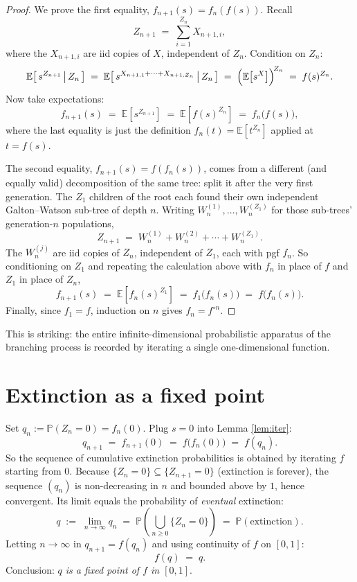 \documentclass[11pt]{article}
\begin{document}
\begin{proof}
We prove the first equality, $f_{n+1}(s) = f_n(f(s))$. Recall
\[
Z_{n+1} \;=\; \sum_{i=1}^{Z_n} X_{n+1, i},
\]
where the $X_{n+1, i}$ are iid copies of $X$, independent of $Z_n$. Condition on $Z_n$:
\[
\mathbb{E}\!\left[\,s^{Z_{n+1}}\,\big|\,Z_n\,\right]
\;=\; \mathbb{E}\!\left[\,s^{X_{n+1,1} + \cdots + X_{n+1, Z_n}}\,\big|\,Z_n\,\right]
\;=\; \Bigl(\mathbb{E}\!\left[s^X\right]\Bigr)^{\!Z_n}
\;=\; f(s)^{Z_n}.
\]
Now take expectations:
\[
f_{n+1}(s) \;=\; \mathbb{E}\!\left[s^{Z_{n+1}}\right]
           \;=\; \mathbb{E}\!\left[f(s)^{Z_n}\right]
           \;=\; f_n\!\bigl(f(s)\bigr),
\]
where the last equality is just the definition $f_n(t) = \mathbb{E}[t^{Z_n}]$ applied at $t = f(s)$.

The second equality, $f_{n+1}(s) = f(f_n(s))$, comes from a different (and equally valid) decomposition of the same tree: split it after the very first generation. The $Z_1$ children of the root each found their own independent Galton--Watson sub-tree of depth $n$. Writing $W^{(1)}_n, \dots, W^{(Z_1)}_n$ for those sub-trees' generation-$n$ populations,
\[
Z_{n+1} \;=\; W^{(1)}_n + W^{(2)}_n + \cdots + W^{(Z_1)}_n.
\]
The $W^{(j)}_n$ are iid copies of $Z_n$, independent of $Z_1$, each with pgf $f_n$. So conditioning on $Z_1$ and repeating the calculation above with $f_n$ in place of $f$ and $Z_1$ in place of $Z_n$,
\[
f_{n+1}(s) \;=\; \mathbb{E}\!\left[f_n(s)^{Z_1}\right] \;=\; f_1\!\bigl(f_n(s)\bigr) \;=\; f\!\bigl(f_n(s)\bigr).
\]
Finally, since $f_1 = f$, induction on $n$ gives $f_n = f^{\circ n}$.
\end{proof}

This is striking: the entire infinite-dimensional probabilistic apparatus of the branching process is recorded by iterating a single one-dimensional function.

\section{Extinction as a fixed point}
Set $q_n := \mathbb{P}(Z_n = 0) = f_n(0)$. Plug $s = 0$ into Lemma \ref{lem:iter}:
\[
q_{n+1} \;=\; f_{n+1}(0) \;=\; f\!\bigl(f_n(0)\bigr) \;=\; f(q_n).
\]
So the sequence of cumulative extinction probabilities is obtained by iterating $f$ starting from $0$. Because $\{Z_n = 0\} \subseteq \{Z_{n+1} = 0\}$ (extinction is forever), the sequence $(q_n)$ is non-decreasing in $n$ and bounded above by $1$, hence convergent. Its limit equals the probability of \emph{eventual} extinction:
\[
q \;:=\; \lim_{n \to \infty} q_n \;=\; \mathbb{P}\!\left(\bigcup_{n \geq 0} \{Z_n = 0\}\right) \;=\; \mathbb{P}(\text{extinction}).
\]
Letting $n \to \infty$ in $q_{n+1} = f(q_n)$ and using continuity of $f$ on $[0,1]$:
\[
\boxed{\, f(q) \;=\; q. \,}
\]
Conclusion: \emph{$q$ is a fixed point of $f$ in $[0, 1]$}.
\end{document}
